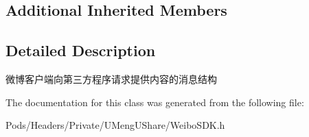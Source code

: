 \subsection*{Additional Inherited Members}


\subsection{Detailed Description}
微博客户端向第三方程序请求提供内容的消息结构 

The documentation for this class was generated from the following file\+:\begin{DoxyCompactItemize}
\item 
Pods/\+Headers/\+Private/\+U\+Meng\+U\+Share/Weibo\+S\+D\+K.\+h\end{DoxyCompactItemize}
